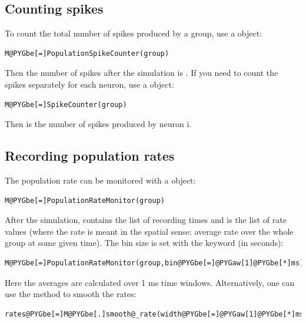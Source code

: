\documentclass[letterpaper,10pt,english]{manual}
\begin{document}
\subsection{Counting spikes}

To count the total number of spikes produced by a group, use a \hyperlink{brian.PopulationSpikeCounter}{} object:

\begin{Verbatim}[commandchars=@\[\]]
M@PYGbe[=]PopulationSpikeCounter(group)
\end{Verbatim}

Then the number of spikes after the simulation is . If you need to count the spikes
separately for each neuron, use a \hyperlink{brian.SpikeCounter}{} object:

\begin{Verbatim}[commandchars=@\[\]]
M@PYGbe[=]SpikeCounter(group)
\end{Verbatim}

Then  is the number of spikes produced by neuron i.


\subsection{Recording population rates}

The population rate can be monitored with a \hyperlink{brian.PopulationRateMonitor}{} object:

\begin{Verbatim}[commandchars=@\[\]]
M@PYGbe[=]PopulationRateMonitor(group)
\end{Verbatim}

After the simulation,  contains the list of recording times and
 is the list of rate values (where the rate is meant in the spatial sense: average rate over
the whole group at some given time). The bin size is set with the  keyword (in seconds):

\begin{Verbatim}[commandchars=@\[\]]
M@PYGbe[=]PopulationRateMonitor(group,bin@PYGbe[=]@PYGaw[1]@PYGbe[*]ms)
\end{Verbatim}

Here the averages are calculated over 1 ms time windows. Alternatively, one can use the
 method to smooth the rates:

\begin{Verbatim}[commandchars=@\[\]]
rates@PYGbe[=]M@PYGbe[.]smooth@_rate(width@PYGbe[=]@PYGaw[1]@PYGbe[*]ms,@PYGaX[filter]@PYGbe[=]@PYGad[']@PYGad[gaussian]@PYGad['])
\end{Verbatim}
\end{document}
